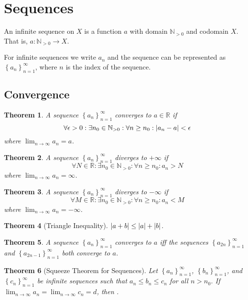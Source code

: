 \documentclass{article}
\theoremstyle{plain}
\newtheorem{theorem}{Theorem}[section]
\numberwithin{theorem}{section}
\theoremstyle{definition}
\numberwithin{definition}{section}
\newcommand*{\N}{\mathbb{N}}
\newcommand*{\R}{\mathbb{R}}
\begin{document}
\section{Sequences}
An infinite sequence on $X$ is a function $a$ with domain $\N_{> 0}$ and codomain $X$. That is, $a:\N_{> 0}\rightarrow X$.

For infinite sequences we write $a_n$ and the sequence can be represented as $\left\{a_n\right\}_{n=1}^\infty$, where $n$ is the index of the sequence.
%
\subsection{Convergence}
\begin{theorem}
	A sequence $\left\{a_n\right\}_{n=1}^\infty$ converges to $a\in \R$ if
	\begin{equation*}
		\forall \epsilon > 0 : \exists n_0 \in \N_{> 0}:\forall n \geq n_0 : \abs{a_n - a} < \epsilon
	\end{equation*}
	where $\lim_{n \rightarrow \infty}a_n = a$.
\end{theorem}
%
\begin{theorem}
	A sequence $\left\{a_n\right\}_{n=1}^\infty$ diverges to $+\infty$ if
	\begin{equation*}
		\forall N \in \R : \exists n_0 \in \N_{> 0}:\forall n \geq n_0 : a_n > N
	\end{equation*}
	where $\lim_{n \rightarrow \infty}a_n = \infty$.
\end{theorem}
%
\begin{theorem}
	A sequence $\left\{a_n\right\}_{n=1}^\infty$ diverges to $-\infty$ if
	\begin{equation*}
		\forall M \in \R : \exists n_0 \in \N_{> 0}:\forall n \geq n_0 : a_n < M
	\end{equation*}
	where $\lim_{n \rightarrow \infty}a_n = -\infty$.
\end{theorem}
%
\begin{theorem}[Triangle Inequality]
	$\abs{a+b}\leq\abs{a}+\abs{b}$.
\end{theorem}
%
\begin{theorem}
	A sequence $\left\{ a_n \right\}_{n=1}^\infty$ converges to $a$ iff the sequences $\left\{ a_{2n} \right\}_{n=1}^\infty$ and $\left\{ a_{2n-1} \right\}_{n=1}^\infty$ both converge to $a$.
\end{theorem}
%
\begin{theorem}[Squeeze Theorem for Sequences]
	Let $\left\{ a_n \right\}_{n=1}^\infty$, $\left\{ b_n \right\}_{n=1}^\infty$, and $\left\{ c_n \right\}_{n=1}^\infty$ be infinite sequences such that $a_n \leq b_n \leq c_n$ for all $n>n_0$. If $\lim_{n\rightarrow\infty}a_n=\lim_{n\rightarrow\infty}c_n=d$, then .
\end{theorem}
%
\end{document}
